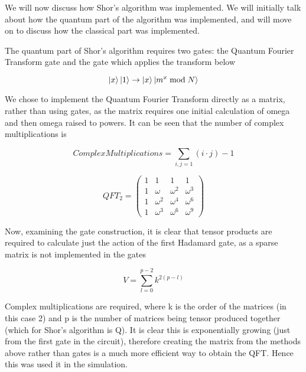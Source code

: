 We will now discuss how Shor's algorithm was implemented. We will initially talk about how the quantum part of the algorithm was implemented, and will move on to discuss how the classical part was implemented.

The quantum part of Shor's algorithm requires two gates: the Quantum Fourier Transform gate and the gate which applies the transform below

\begin{equation}
 \left| x \right>\left| 1 \right> \rightarrow \left| x \right>\left| m^x \bmod N \right>
\end{equation}

We chose to implement the Quantum Fourier Transform directly as a matrix, rather than using gates, as the matrix requires one initial calculation of omega and then omega raised to powers. It can be seen that the number of complex multiplications is

\begin{equation}
 ComplexMultiplications = \sum_{i,j=1} (i \cdot j) - 1
\end{equation}

\begin{equation}
 QFT_{2}=\begin{pmatrix}1 & 1 &1 &1 \\ 
 1 & \omega & \omega^{2} & \omega^{3} \\
 1 & \omega^{2} & \omega^{4} & \omega^{6} \\
 1 & \omega^{3} & \omega^{6} & \omega^{9} \end{pmatrix}
\end{equation}

Now, examining the gate construction, it is clear that  tensor products are required to calculate just the action of the first Hadamard gate, as a sparse matrix is not implemented in the gates  

\begin{equation}
 V =\sum_{l=0}^{p-2} k^{2(p-l)}
\end{equation}

Complex multiplications are required, where k is the order of the matrices (in this case 2) and p is the number of matrices being tensor produced together (which for Shor’s algorithm is Q). It is clear this is exponentially growing  (just from the first gate in the circuit), therefore creating the matrix from the methods above rather than gates is a much more efficient way to obtain the QFT. Hence this was used it in the simulation.

